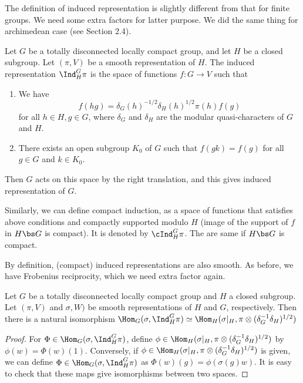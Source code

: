 The definition of induced representation is slightly different from that for finite groups. We need some extra factors for latter purpose. We did the same thing for archimedean case (see Section 2.4). 
\begin{definition}
Let $G$ be a totally disconnected locally compact group, and let $H$ be a closed subgroup. 
Let $(\pi, V)$ be a smooth representation of $H$. The induced representation $\Ind_{H}^{G}\pi$ is the space of functions $f:G\to V$ such that 
\begin{enumerate}
\item We have 
$$
f(hg) = \delta_G(h)^{-1/2} \delta_H(h)^{1/2}\pi(h)f(g)
$$
for all $h\in H, g\in G$, where $\delta_G$ and $\delta_H$ are the modular quasi-characters of $G$ and $H$. 
\item There exists an open subgroup $K_0$ of $G$ such that $f(gk) = f(g)$ for all $g\in G$ and $k\in K_0$. 
\end{enumerate}
Then $G$ acts on this space by the right translation, and this gives induced representation of $G$. 

Similarly, we can define compact induction, as a space of functions that satisfies above conditions and compactly supported modulo $H$ (image of the support of $f$ in $H\bs G$ is compact). It is denoted by $\cInd_{H}^{G}\pi$. The are same if $H\bs G$ is compact. 
\end{definition}
By definition, (compact) induced representations are also smooth. As before, we have Frobenius reciprocity, which we need extra factor again. 

\begin{proposition}
Let $G$ be a totally disconnected locally compact group and $H$ a closed subgroup. 
Let $(\pi, V)$ and $\sigma, W)$ be smooth representations of $H$ and $G$, respectively. 
Then there is a natural isomorphism $\Hom_G(\sigma, \Ind_H^{G}\pi) \simeq \Hom_H(\sigma|_{H}, \pi \otimes (\delta_{G}^{-1}\delta_{H})^{1/2})$
\end{proposition}
\begin{proof}
For $\Phi\in \Hom_G(\sigma, \Ind_{H}^{G}\pi)$, define $\phi\in \Hom_H(\sigma|_{H}, \pi\otimes (\delta_{G}^{-1}\delta_{H})^{1/2})$ by $\phi(w) = \Phi(w)(1)$. 
Conversely, if $\phi\in \Hom_H(\sigma|_{H}, \pi\otimes (\delta_{G}^{-1}\delta_{H})^{1/2})$ is given, we can define $\Phi\in \Hom_G(\sigma, \Ind_{H}^{G}\pi)$ as $\Phi(w)(g) = \phi(\sigma(g)w)$. 
It is easy to check that these maps give isomorphisms between two spaces. 
\end{proof}

